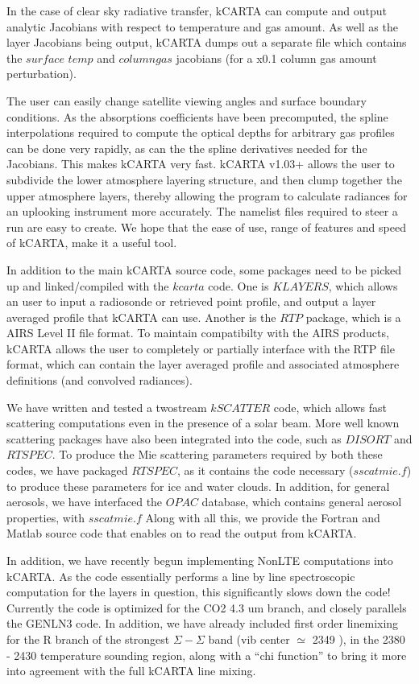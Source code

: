 \documentclass[12pt]{article}
\newcommand{\kc}{\textsf{kCARTA}\xspace}
\begin{document}
In the case of clear sky radiative transfer, \kc can compute and output 
analytic Jacobians with respect to temperature and gas amount.  As well
as the layer Jacobians being output, \kc dumps out a separate file which
contains the $surface$ $temp$ and $column gas$ jacobians (for a x0.1 
column gas amount perturbation).

The user can easily change satellite viewing angles
and surface boundary conditions.  As the absorptions coefficients have
been precomputed, the spline interpolations required to compute the
optical depths for arbitrary gas profiles can be done very rapidly, as
can the the spline derivatives needed for the Jacobians.  This makes
\kc very fast.  \kc v1.03+ allows the user to subdivide the lower atmosphere 
layering structure, and then clump together the upper atmosphere layers, 
thereby allowing the program to calculate radiances
for an uplooking instrument more accurately. The namelist files required to 
steer a run are easy to create.  We hope that the ease of use, range of 
features and speed of \kc, make it a useful tool.

In addition to the main \kc source code, some packages need to be picked up
and linked/compiled with the $kcarta$ code. One is $KLAYERS$, which allows an 
user to input a radiosonde or retrieved point profile, and output a layer 
averaged profile that \kc can use. Another is the $RTP$ package, which is a 
AIRS Level II file format. To maintain compatibilty with the AIRS products, 
\kc allows the user to completely or partially interface with the RTP file 
format, which can contain the layer averaged profile and associated 
atmosphere definitions (and convolved radiances). 

We have written and tested a twostream $kSCATTER$ code, which allows fast 
scattering
computations even in the presence of a solar beam. More well known scattering
packages have also been integrated into the code, such as $DISORT$ and 
$RTSPEC$. To produce the Mie scattering parameters required
by both these codes, we have packaged $RTSPEC$, as it contains the code 
necessary ($sscatmie.f$) to produce these parameters for ice and water clouds. 
In addition, for general aerosols, we have interfaced the $OPAC$ database, 
which contains general aerosol properties, with $sscatmie.f$ Along with all 
this, we provide the Fortran and Matlab source code that enables on to read
the output from \kc.

In addition, we have recently begun implementing NonLTE computations into \kc.
As the code essentially performs a line by line spectroscopic computation for
the layers in question, this significantly slows down the code! Currently the
code is optimized for the CO2 4.3 um branch, and closely parallels the GENLN3
code. In addition, we have already included first order linemixing for the R 
branch of the strongest $\Sigma-\Sigma$ band (vib center $\simeq$ 2349 \wn), 
in the 2380 - 2430 \wn temperature sounding region, along with a 
``chi function'' to bring it more into agreement with the full  kCARTA line
mixing.
\end{document}

